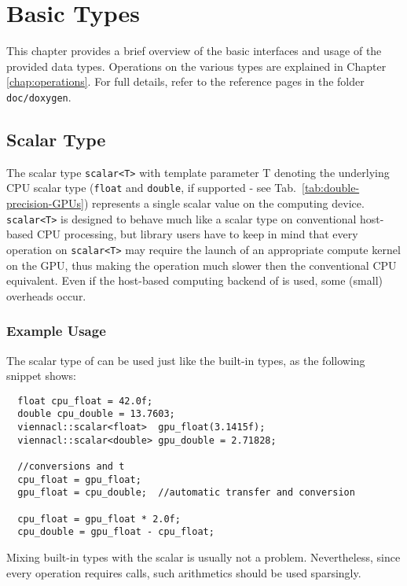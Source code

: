 \chapter{Basic Types} \label{chap:basic-types}
This chapter provides a brief overview of the basic interfaces and usage of the
provided data types. Operations on the various types are explained in
Chapter \ref{chap:operations}. For full details, refer to the reference pages
in the folder \texttt{doc/doxygen}.

\section {Scalar Type}
The scalar type \lstinline|scalar<T>| with template parameter T
denoting the underlying CPU scalar type (\lstinline|float| and \lstinline|double|, if supported - see Tab.~\ref{tab:double-precision-GPUs}) represents a
single scalar value on the computing device. \lstinline|scalar<T>| is designed to behave much
like a scalar type on conventional host-based CPU processing, but library users have to keep in mind that
every operation on \lstinline|scalar<T>| may require the launch of an appropriate
compute kernel on the GPU, thus making the operation much slower then the conventional CPU equivalent.
Even if the host-based computing backend of {\ViennaCL} is used, some (small) overheads occur.


\subsection{Example Usage}
The scalar type of {\ViennaCL} can be used just like the built-in
types, as the following snippet shows:
\begin{lstlisting}
  float cpu_float = 42.0f;
  double cpu_double = 13.7603;
  viennacl::scalar<float>  gpu_float(3.1415f);
  viennacl::scalar<double> gpu_double = 2.71828;

  //conversions and t
  cpu_float = gpu_float;
  gpu_float = cpu_double;  //automatic transfer and conversion

  cpu_float = gpu_float * 2.0f;
  cpu_double = gpu_float - cpu_float;
\end{lstlisting}
Mixing built-in types with the {\ViennaCL} scalar is usually not a
problem. Nevertheless, since every operation requires {\OpenCL} calls, such
arithmetics should be used sparsingly.

